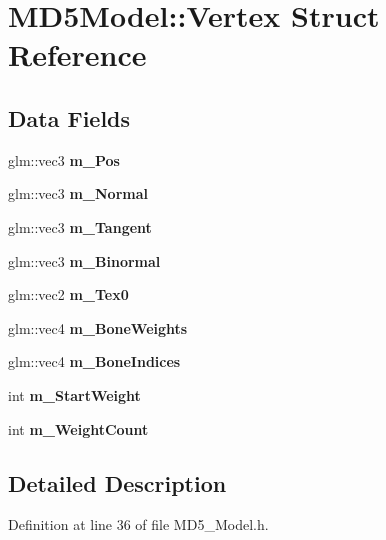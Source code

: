 \hypertarget{struct_m_d5_model_1_1_vertex}{}\section{M\+D5\+Model\+:\+:Vertex Struct Reference}
\label{struct_m_d5_model_1_1_vertex}
\subsection*{Data Fields}
\begin{DoxyCompactItemize}
\item 
glm\+::vec3 {\bfseries m\+\_\+\+Pos}\hypertarget{struct_m_d5_model_1_1_vertex_aa80f1491b2282065d93b461584727dce}{}\label{struct_m_d5_model_1_1_vertex_aa80f1491b2282065d93b461584727dce}

\item 
glm\+::vec3 {\bfseries m\+\_\+\+Normal}\hypertarget{struct_m_d5_model_1_1_vertex_a6a3958b87be55b3213188fb07a45fa98}{}\label{struct_m_d5_model_1_1_vertex_a6a3958b87be55b3213188fb07a45fa98}

\item 
glm\+::vec3 {\bfseries m\+\_\+\+Tangent}\hypertarget{struct_m_d5_model_1_1_vertex_a8742e37c0a379d53122d774e2ac613f7}{}\label{struct_m_d5_model_1_1_vertex_a8742e37c0a379d53122d774e2ac613f7}

\item 
glm\+::vec3 {\bfseries m\+\_\+\+Binormal}\hypertarget{struct_m_d5_model_1_1_vertex_ab22ba173bf3a04ff24afb55384fa8375}{}\label{struct_m_d5_model_1_1_vertex_ab22ba173bf3a04ff24afb55384fa8375}

\item 
glm\+::vec2 {\bfseries m\+\_\+\+Tex0}\hypertarget{struct_m_d5_model_1_1_vertex_acd2f4166e0d987f3a96546b816ab600b}{}\label{struct_m_d5_model_1_1_vertex_acd2f4166e0d987f3a96546b816ab600b}

\item 
glm\+::vec4 {\bfseries m\+\_\+\+Bone\+Weights}\hypertarget{struct_m_d5_model_1_1_vertex_a161ecefc3a66dbe6e3bdbd6c5be595d5}{}\label{struct_m_d5_model_1_1_vertex_a161ecefc3a66dbe6e3bdbd6c5be595d5}

\item 
glm\+::vec4 {\bfseries m\+\_\+\+Bone\+Indices}\hypertarget{struct_m_d5_model_1_1_vertex_ae9093a7c890b8a5a9c0ff424c413195f}{}\label{struct_m_d5_model_1_1_vertex_ae9093a7c890b8a5a9c0ff424c413195f}

\item 
int {\bfseries m\+\_\+\+Start\+Weight}\hypertarget{struct_m_d5_model_1_1_vertex_ac8f02d6c15cd60ae82de5e7e90d6e424}{}\label{struct_m_d5_model_1_1_vertex_ac8f02d6c15cd60ae82de5e7e90d6e424}

\item 
int {\bfseries m\+\_\+\+Weight\+Count}\hypertarget{struct_m_d5_model_1_1_vertex_ae6f7fec085ac28aab56656e398959c6d}{}\label{struct_m_d5_model_1_1_vertex_ae6f7fec085ac28aab56656e398959c6d}

\end{DoxyCompactItemize}


\subsection{Detailed Description}


Definition at line 36 of file M\+D5\+\_\+\+Model.\+h.

